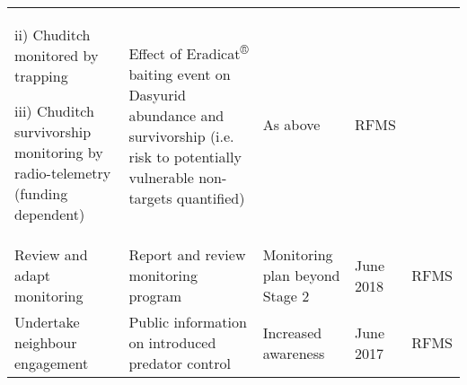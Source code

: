 \documentclass[version=last,
    paper=a4,                               %
    10pt,                                   %
    dvipsnames,
    oneside,                              %
    headings=openany,                       %
    open=any,
    BCOR=7mm,                               %
    DIV=15,     %
]{scrbook}
\begin{document}
\begin{longtable}[c]{@{}lllll@{}}
\begin{minipage}[t]{0.17\columnwidth}
ii) Chuditch monitored by trapping

iii) Chuditch survivorship monitoring by radio-telemetry (funding
dependent)
\end{minipage} & \begin{minipage}[t]{0.17\columnwidth}\raggedright
Effect of Eradicat\textsuperscript{®} baiting event on Dasyurid
abundance and survivorship (i.e. risk to potentially vulnerable
non-targets quantified)
\end{minipage} & \begin{minipage}[t]{0.17\columnwidth}\raggedright
As above
\end{minipage} & \begin{minipage}[t]{0.17\columnwidth}\raggedright
RFMS
\end{minipage}
\\\addlinespace
\begin{minipage}[t]{0.17\columnwidth}\raggedright
Review and adapt monitoring
\end{minipage} & \begin{minipage}[t]{0.17\columnwidth}\raggedright
Report and review monitoring program
\end{minipage} & \begin{minipage}[t]{0.17\columnwidth}\raggedright
Monitoring plan beyond Stage 2
\end{minipage} & \begin{minipage}[t]{0.17\columnwidth}\raggedright
June 2018
\end{minipage} & \begin{minipage}[t]{0.17\columnwidth}\raggedright
RFMS
\end{minipage}
\\\addlinespace
\begin{minipage}[t]{0.17\columnwidth}\raggedright
Undertake neighbour engagement
\end{minipage} & \begin{minipage}[t]{0.17\columnwidth}\raggedright
Public information on introduced predator control
\end{minipage} & \begin{minipage}[t]{0.17\columnwidth}\raggedright
Increased awareness
\end{minipage} & \begin{minipage}[t]{0.17\columnwidth}\raggedright
June 2017
\end{minipage} & \begin{minipage}[t]{0.17\columnwidth}\raggedright
RFMS
\end{minipage}

\end{longtable}
\end{document}
